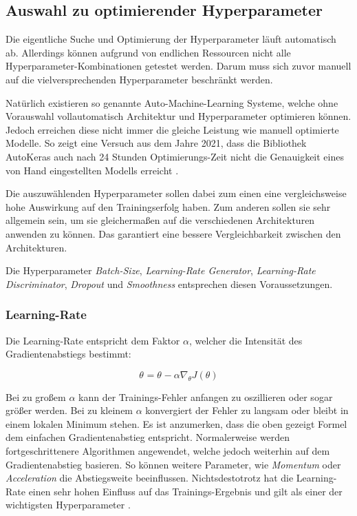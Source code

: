 \subsection{Auswahl zu optimierender Hyperparameter}
Die eigentliche Suche und Optimierung der Hyperparameter läuft automatisch ab.
Allerdings können aufgrund von endlichen Ressourcen nicht alle Hyperparameter-Kombinationen getestet werden.
Darum muss sich zuvor manuell auf die vielversprechenden Hyperparameter beschränkt werden.
\newline

Natürlich existieren so genannte Auto-Machine-Learning Systeme, welche ohne Vorauswahl vollautomatisch Architektur und Hyperparameter optimieren können. 
Jedoch erreichen diese nicht immer die gleiche Leistung wie manuell optimierte Modelle.
So zeigt eine Versuch aus dem Jahre 2021, dass die Bibliothek AutoKeras \cite{auto-keras} auch nach 24 Stunden Optimierungs-Zeit nicht die Genauigkeit eines von Hand eingestellten Modells erreicht \cite[S. 2036]{dl-framework-evaluation}.
\newline

Die auszuwählenden Hyperparameter sollen dabei zum einen eine vergleichsweise hohe Auswirkung auf den Trainingserfolg haben.
Zum anderen sollen sie sehr allgemein sein, um sie gleichermaßen auf die verschiedenen Architekturen anwenden zu können.
Das garantiert eine bessere Vergleichbarkeit zwischen den Architekturen.
\newline

Die Hyperparameter \textit{Batch-Size}, \textit{Learning-Rate Generator}, \textit{Learning-Rate Discriminator}, \textit{Dropout} und \textit{Smoothness} entsprechen diesen Voraussetzungen.
\newline

\subsubsection{Learning-Rate}
Die Learning-Rate entspricht dem Faktor \(\alpha\), welcher die Intensität des Gradientenabstiegs bestimmt:  

\[\theta_{}  =  \theta_{}  - \alpha   \nabla_{ \theta }  J( \theta )  \]

Bei zu großem \(\alpha\) kann der Trainings-Fehler anfangen zu oszillieren oder sogar größer werden.
Bei zu kleinem \(\alpha\) konvergiert der Fehler zu langsam oder bleibt in einem lokalen Minimum stehen. 
Es ist anzumerken, dass die oben gezeigt Formel dem einfachen Gradientenabstieg entspricht.
Normalerweise werden fortgeschrittenere Algorithmen angewendet, welche jedoch weiterhin auf dem Gradientenabstieg basieren.
So können weitere Parameter, wie \textit{Momentum} oder \textit{Acceleration} die Abstiegsweite beeinflussen.
Nichtsdestotrotz hat die Learning-Rate einen sehr hohen Einfluss auf das Trainings-Ergebnis und gilt als einer der wichtigsten Hyperparameter \cite[S. 447]{learning-rate-most-important}. 
\newline

